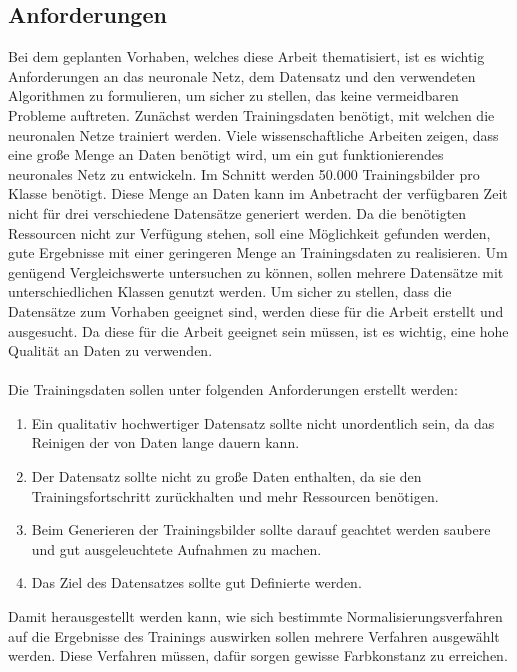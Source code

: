 \documentclass[a4paper,12pt,oneside]{article}
\begin{document}
  \subsection{Anforderungen}\label{s.anforderungen}
Bei dem geplanten Vorhaben, welches diese Arbeit thematisiert, ist es wichtig Anforderungen an das neuronale Netz, dem Datensatz und den verwendeten Algorithmen zu formulieren, um sicher zu stellen, das keine vermeidbaren Probleme auftreten. Zunächst werden Trainingsdaten benötigt, mit welchen die neuronalen Netze trainiert werden. Viele wissenschaftliche Arbeiten zeigen, dass eine große Menge an Daten benötigt wird, um ein gut funktionierendes neuronales Netz zu entwickeln. Im Schnitt werden 50.000 Trainingsbilder pro Klasse benötigt. Diese Menge an Daten kann im Anbetracht der verfügbaren Zeit nicht für drei verschiedene Datensätze generiert werden. Da die benötigten Ressourcen nicht zur Verfügung stehen, soll eine Möglichkeit gefunden werden, gute Ergebnisse mit einer geringeren Menge an Trainingsdaten zu realisieren. Um genügend Vergleichswerte untersuchen zu können, sollen mehrere Datensätze mit unterschiedlichen Klassen genutzt werden. Um sicher zu stellen, dass die Datensätze zum Vorhaben geeignet sind, werden diese für die Arbeit erstellt und ausgesucht. Da diese für die Arbeit geeignet sein müssen, ist es wichtig, eine hohe Qualität an Daten zu verwenden.\\\\
Die Trainingsdaten sollen unter folgenden Anforderungen erstellt werden:
\begin{enumerate} 
\item Ein qualitativ hochwertiger Datensatz sollte nicht unordentlich sein, da das Reinigen der von Daten lange dauern kann.
\item Der Datensatz sollte nicht zu große Daten enthalten, da sie den Trainingsfortschritt zurückhalten und mehr Ressourcen benötigen.
\item Beim Generieren der Trainingsbilder sollte darauf geachtet werden saubere und gut ausgeleuchtete Aufnahmen zu machen.
\item Das Ziel des Datensatzes sollte gut Definierte werden.
\end{enumerate}
Damit herausgestellt werden kann, wie sich bestimmte Normalisierungsverfahren auf die Ergebnisse des Trainings auswirken sollen mehrere Verfahren ausgewählt werden. Diese Verfahren müssen, dafür sorgen gewisse Farbkonstanz zu erreichen. 
\end{document}

